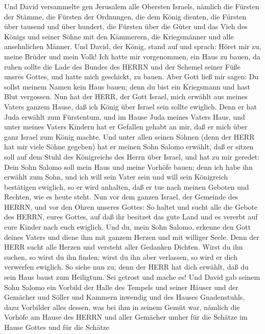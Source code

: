  Und David versammelte gen Jerusalem alle Obersten Israels,
nämlich die Fürsten der Stämme, die Fürsten der Ordnungen, die dem König
dienten, die Fürsten über tausend und über hundert, die Fürsten über die
Güter und das Vieh des Königs und seiner Söhne mit den Kämmerern, die
Kriegsmänner und alle ansehnlichen Männer.  Und David, der
König, stand auf und sprach: Höret mir zu, meine Brüder und mein Volk!
Ich hatte mir vorgenommen, ein Haus zu bauen, da ruhen sollte die Lade
des Bundes des HERRN und der Schemel seiner Füße unsres Gottes, und
hatte mich geschickt, zu bauen.  Aber Gott ließ mir sagen:
Du sollst meinem Namen kein Haus bauen; denn du bist ein Kriegsmann und
hast Blut vergossen.  Nun hat der HERR, der Gott Israel,
mich erwählt aus meines Vaters ganzem Hause, daß ich König über Israel
sein sollte ewiglich. Denn er hat Juda erwählt zum Fürstentum, und im
Hause Juda meines Vaters Haus, und unter meines Vaters Kindern hat er
Gefallen gehabt an mir, daß er mich über ganz Israel zum König machte.
 Und unter allen seinen Söhnen (denn der HERR hat mir viele
Söhne gegeben) hat er meinen Sohn Salomo erwählt, daß er sitzen soll auf
dem Stuhl des Königreichs des Herrn über Israel,  und hat zu
mir geredet: Dein Sohn Salomo soll mein Haus und meine Vorhöfe bauen;
denn ich habe ihn erwählt zum Sohn, und ich will sein Vater sein
 und will sein Königreich bestätigen ewiglich, so er wird
anhalten, daß er tue nach meinen Geboten und Rechten, wie es heute
steht.  Nun vor dem ganzen Israel, der Gemeinde des HERRN,
und vor den Ohren unseres Gottes: So haltet und sucht alle die Gebote
des HERRN, eures Gottes, auf daß ihr besitzet das gute Land und es
vererbt auf eure Kinder nach euch ewiglich.  Und du, mein
Sohn Salomo, erkenne den Gott deines Vaters und diene ihm mit ganzem
Herzen und mit williger Seele. Denn der HERR sucht alle Herzen und
versteht aller Gedanken Dichten. Wirst du ihn suchen, so wirst du ihn
finden; wirst du ihn aber verlassen, so wird er dich verwerfen ewiglich.
 So siehe nun zu; denn der HERR hat dich erwählt, daß du
sein Haus baust zum Heiligtum. Sei getrost und mache es! 
Und David gab seinem Sohn Salomo ein Vorbild der Halle des Tempels und
seiner Häuser und der Gemächer und Söller und Kammern inwendig und des
Hauses Gnadenstuhls,  dazu Vorbilder alles dessen, was bei
ihm in seinem Gemüt war, nämlich die Vorhöfe am Hause des HERRN und
aller Gemächer umher für die Schätze im Hause Gottes und für die Schätze
